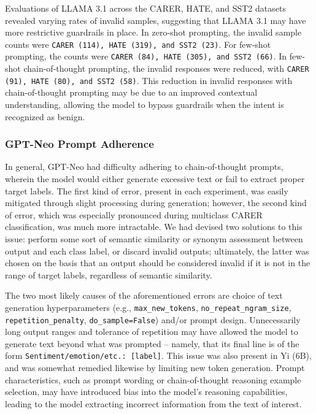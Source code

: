 \documentclass[twocolumn]{article}
\newcommand{\tcode}[1]{\texttt{#1}}
\begin{document}
Evaluations of LLAMA 3.1 across the CARER, HATE, and SST2 datasets revealed varying rates of invalid samples, suggesting that LLAMA 3.1 may have more restrictive guardrails in place. In zero-shot prompting, the invalid sample counts were \tcode{CARER (114), HATE (319), and SST2 (23)}. For few-shot prompting, the counts were \tcode{CARER (84), HATE (305), and SST2 (66)}. In few-shot chain-of-thought prompting, the invalid responses were reduced, with \tcode{CARER (91), HATE (80), and SST2 (58)}. This reduction in invalid responses with chain-of-thought prompting may be due to an improved contextual understanding, allowing the model to bypass guardrails when the intent is recognized as benign.

\subsubsection{GPT-Neo Prompt Adherence}

In general, GPT-Neo had difficulty adhering to chain-of-thought prompts, wherein the model would either generate excessive text or fail to extract proper target labels. The first kind of error, present in each experiment, was easily mitigated through slight processing during generation; however, the second kind of error, which was especially pronounced during multiclass CARER classification, was much more intractable. We had devised two solutions to this issue: perform some sort of semantic similarity or synonym assessment between output and each class label, or discard invalid outputs; ultimately, the latter was chosen on the basis that an output should be considered invalid if it is not in the range of target labels, regardless of semantic similarity.

The two most likely causes of the aforementioned errors are choice of text generation hyperparameters (e.g., \tcode{max\_new\_tokens}, \tcode{no\_repeat\_ngram\_size}, \tcode{repetition\_penalty}, \tcode{do\_sample=False}) and/or prompt design. Unnecessarily long output ranges and tolerance of repetition may have allowed the model to generate text beyond what was prompted – namely, that its final line is of the form \tcode{Sentiment/emotion/etc.: [label]}. This issue was also present in Yi (6B), and was somewhat remedied likewise by limiting new token generation. Prompt characteristics, such as prompt wording or chain-of-thought reasoning example selection, may have introduced bias into the model’s reasoning capabilities, leading to the model extracting incorrect information from the text of interest.
\end{document}
